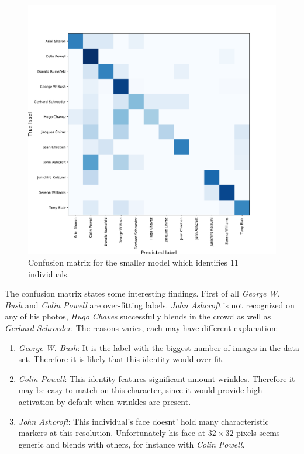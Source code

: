 \begin{figure}[ht!]
    \centering
    \includegraphics[width=\textwidth]{obrazky-figures/confusion.pdf}
    \caption{Confusion matrix for the smaller model which identifies 11 individuals.}
    \label{fig:confusion1}
\end{figure}

The confusion matrix states some interesting findings. First of all \textit{George W. Bush} and \textit{Colin Powell} are over-fitting labels. \textit{John Ashcroft} is not recognized on any of his photos, \textit{Hugo Chaves} successfully blends in the crowd as well as \textit{Gerhard Schroeder}. The reasons varies, each may have different explanation:

\begin{enumerate}
    \item \textit{George W. Bush}: It is the label with the biggest number of images in the data set. Therefore it is likely that this identity would over-fit.
    \item \textit{Colin Powell}: This identity features significant amount wrinkles. Therefore it may be easy to match on this character, since it would provide high activation by default when wrinkles are present.
    \item \textit{John Ashcroft}: This individual's face doesnt' hold many characteristic markers at this resolution. Unfortunately his face at $32\times32$ pixels seems generic and blends with others, for instance with \textit{Colin Powell}.
\end{enumerate}

